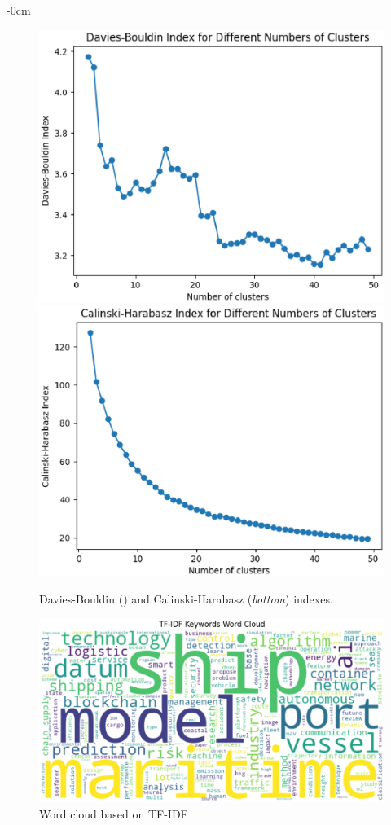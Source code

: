 \documentclass[jmse,review,submit,pdftex,moreauthors]{Definitions/mdpi}
\begin{document}
\begin{adjustwidth}{-\extralength}{0cm}
\begin{figure}[H]
	\centering
	\includegraphics[height=0.2\textheight, keepaspectratio]{pics/davis_bouldin.eps}
	\includegraphics[height=0.2\textheight, keepaspectratio]{pics/calinski.eps}
	\caption{Davies-Bouldin () and Calinski-Harabasz (\textit{bottom}) indexes.}\label{fig:fig10}
\end{figure}

\begin{figure}[H]
	\centering
	\includegraphics[width=\linewidth]{pics/wordcloud_1.eps}
	\caption{Word cloud based on TF-IDF}\label{fig:fig11}
\end{figure}


\end{adjustwidth}
\end{document}

